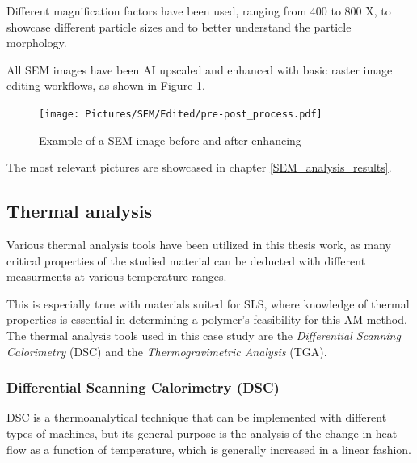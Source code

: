 \documentclass{article}
\begin{document}
            Different magnification factors have been used, ranging from 400 to 800 X, to showcase different particle sizes and to better understand 
            the particle morphology. 

            \clearpage

            All SEM images have been AI upscaled and enhanced with basic raster image editing workflows, as shown in Figure \ref{fig:SEM_edited_vs_unedited}. \\ 

                \begin{figure}[ht]
                    \centering
                    \texttt{[image: Pictures/SEM/Edited/pre-post\_process.pdf]}
                    \caption{Example of a SEM image before and after enhancing}
                    \label{fig:SEM_edited_vs_unedited}
                \end{figure}

            The most relevant pictures are showcased in chapter \ref{SEM_analysis_results}. \\

            \clearpage

            \subsection{Thermal analysis\label{Thermal_analysis}}
    
            Various thermal analysis tools have been utilized in this thesis work, as many critical properties of the studied material 
            can be deducted with different measurments at various temperature ranges. 

            This is especially true with materials suited for SLS, where knowledge of thermal properties is 
            essential in determining a polymer's feasibility for this AM method. 
            The thermal analysis tools used in this case study are the \textit{Differential Scanning Calorimetry} (DSC) and the
            \textit{Thermogravimetric Analysis} (TGA). \\

            \subsubsection{Differential Scanning Calorimetry (DSC)\label{DSC_analysis}}
        
            DSC is a thermoanalytical technique that can be implemented with different types of machines, 
            but its general purpose is the analysis of the change in heat flow as a function of temperature, which is generally increased in 
            a linear fashion. 
        
\end{document}

